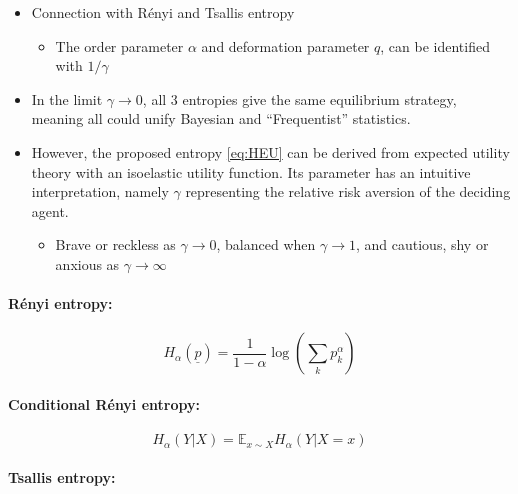 \documentclass{article}
\theoremstyle{definition}
\begin{document}
\begin{itemize}
    \item Connection with Rényi \cite{paper:RenyiOriginal,book:RenyiAczel} and Tsallis \cite{paper:TsallisOriginal,book:TsallisGellMann,book:Tsallis} entropy
    \begin{itemize}
        \item The order parameter $\alpha$ and deformation parameter $q$, can be identified with $1/\gamma$
    \end{itemize}
    \item In the limit $\gamma \to 0$, all 3 entropies give the same equilibrium strategy, meaning all could unify Bayesian and ``Frequentist'' statistics.
    \item However, the proposed entropy \eqref{eq:HEU} can be derived from expected utility theory with an isoelastic utility function. Its parameter has an intuitive interpretation, namely $\gamma$ representing the relative risk aversion of the deciding agent.
    \begin{itemize}
        \item Brave or reckless as $\gamma \to 0$, balanced when $\gamma \to 1$, and cautious, shy or anxious as $\gamma \to \infty$
    \end{itemize}
\end{itemize}

\paragraph{Rényi entropy:} \cite{paper:RenyiOriginal}

\begin{equation}
    H_\alpha(\underline{p}) = \frac{1}{1-\alpha} \log \left ( \sum_k p_k^\alpha \right )
\end{equation}

\paragraph{Conditional Rényi entropy:} \cite{paper:ConditionalRenyi}

\begin{equation}
    H_\alpha(Y|X) = \mathbb{E}_{x \sim X} H_\alpha(Y|X=x)
\end{equation}

\paragraph{Tsallis entropy:} \cite{paper:TsallisOriginal}
\end{document}
